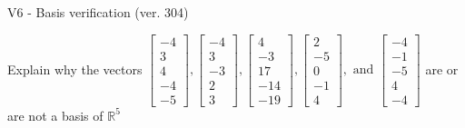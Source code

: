 \begin{exercise}
  \begin{exerciseTitle}V6 - Basis verification (ver. 304)\end{exerciseTitle}
  \begin{exerciseStatement}
    Explain why the vectors \(\left[\begin{array}{r}
-4 \\
3 \\
4 \\
-4 \\
-5
\end{array}\right] , \left[\begin{array}{r}
-4 \\
3 \\
-3 \\
2 \\
3
\end{array}\right] , \left[\begin{array}{r}
4 \\
-3 \\
17 \\
-14 \\
-19
\end{array}\right] , \left[\begin{array}{r}
2 \\
-5 \\
0 \\
-1 \\
4
\end{array}\right] , \text{ and } \left[\begin{array}{r}
-4 \\
-1 \\
-5 \\
4 \\
-4
\end{array}\right]\) are or are not a basis of \(\mathbb{R}^5\)	



\end{exerciseStatement}
\end{exercise}
